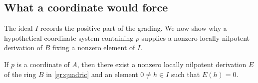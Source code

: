 \subsection{What a coordinate would force}

The ideal $I$ records the positive part of the grading.  We now show
why a hypothetical coordinate system containing $p$ supplies a nonzero
locally nilpotent derivation of $B$ fixing a nonzero element of $I$.

\begin{proposition}
\label{prop:coordinate-obstruction}
If $p$ is a coordinate of $A$, then there exist a nonzero locally
nilpotent derivation $E$ of the ring $B$ in \eqref{gr:quadric} and
an element $0\ne h\in I$ such that $E(h)=0$.
\end{proposition}

